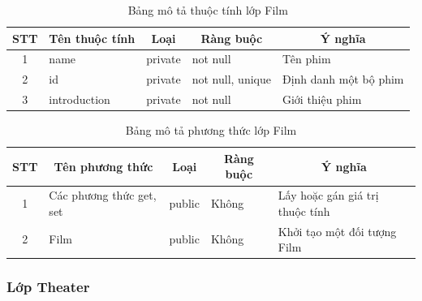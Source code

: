 \documentclass[a4paper, 12pt]{article}
\begin{document}
\begin{table}[H]
	\begin{center}
		\begin{tabular}{|c|l|l|l|l|}
			\hline
			STT                     & \multicolumn{1}{c|}{Tên thuộc tính} & \multicolumn{1}{c|}{Loại}    & \multicolumn{1}{c|}{Ràng buộc} & \multicolumn{1}{c|}{Ý nghĩa} \\ \hline
			1                       & name                                & \multicolumn{1}{c|}{private} & not null                       & Tên phim                     \\ \hline
			2                       & id                                  & private                      & not null, unique               & Định danh một bộ phim        \\ \hline
			3			   		    & introduction                        & private                      &         not null                       & Giới thiệu phim              \\ \hline
			\end{tabular}
			\caption{Bảng mô tả thuộc tính lớp Film}
	\end{center}
\end{table}

\begin{table}[H]
	\begin{center}
		\begin{tabular}{|c|l|c|l|l|}
			\hline
			STT & \multicolumn{1}{c|}{Tên phương thức} & Loại                        & \multicolumn{1}{c|}{Ràng buộc} & \multicolumn{1}{c|}{Ý nghĩa}    \\ \hline
			1   & Các phương thức get, set             & public                      &            Không                    & Lấy hoặc gán giá trị thuộc tính \\ \hline
			2   & Film                                 & \multicolumn{1}{l|}{public} &                 Không               & Khởi tạo một đối tượng Film     \\ \hline
			\end{tabular}
			\caption{Bảng mô tả phương thức lớp Film}
	\end{center}
\end{table}

\subsubsection{Lớp Theater}
\end{document}
